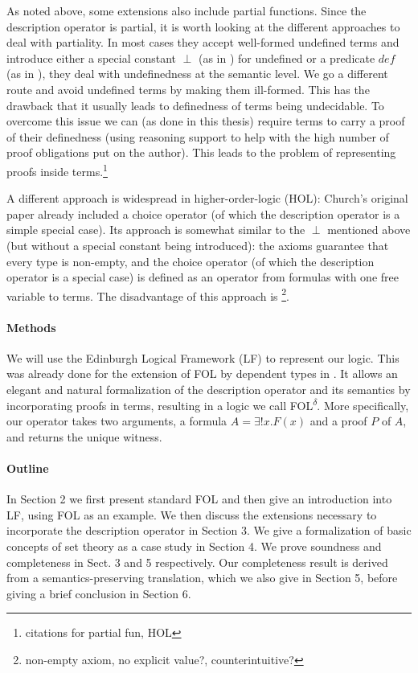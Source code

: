 \documentclass{article}
\begin{document}
As noted above, some extensions also include partial functions. Since the description operator is partial, it is worth looking at the different approaches to deal with partiality.
In most cases they accept well-formed undefined terms and introduce either a special constant $\perp$ (as in \cite{lpf}) for undefined or a predicate $def$ (as in \cite{casl}), they deal with undefinedness at the semantic level. We go a different route and avoid undefined terms by making them ill-formed. This has the drawback that it usually leads to definedness of terms being undecidable. To overcome this issue we can (as done in this thesis) require terms to carry a proof of their definedness  (using reasoning support to help with the high number of proof obligations put on the author). This leads to the problem of representing proofs inside terms.\footnote{citations for partial fun, HOL}

A different approach is widespread in higher-order-logic (HOL): Church's original paper \cite{churchtypes} already included a choice operator (of which the description operator is a simple special case). Its approach is somewhat similar to the $\perp$ mentioned above (but without a special constant being introduced): the axioms guarantee that every type is non-empty, and the choice operator (of which the description operator is a special case) is defined as an operator from formulas with one free variable to terms. The disadvantage of this approach is \footnote{ non-empty axiom, no explicit value?, counterintuitive?}. 

\paragraph{Methods} We will use the Edinburgh Logical Framework (LF) \cite{lf}
to represent our logic. This was already done for the extension of FOL by dependent types in \cite{dfol}. It allows an elegant and natural formalization of the description operator and its semantics by incorporating proofs in terms, resulting in a logic we call FOL\textsuperscript{$\delta$}. More specifically, our operator takes two arguments, a formula $A=\exists!x.F(x)$ and a proof $P$ of $A$, and returns the unique witness.

\paragraph{Outline}In Section 2 we first present standard FOL and then give an introduction into LF, using FOL as an example. We then discuss the extensions necessary to incorporate the description operator in Section 3. We give a formalization of basic concepts of set theory as a case study in Section 4. We prove soundness and completeness in Sect. 3 and 5 respectively. Our completeness result is derived from a semantics-preserving translation, which we also give in Section 5, before giving a brief conclusion in Section 6.
\end{document}
